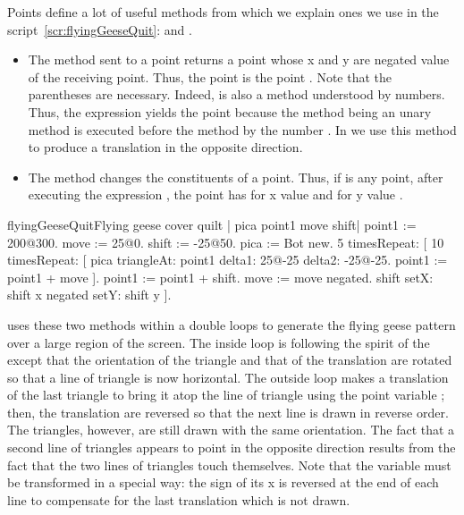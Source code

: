 Points define a lot of useful methods from which we explain ones  we use in the script~\ref{scr:flyingGeeseQuit}:  and .
\begin{itemize}
\item 
The method  sent to a point returns a point whose
x and y are negated value of the receiving
point. Thus, the point  is the point . Note that the
parentheses are necessary. Indeed,  is also a
method understood by numbers. Thus, the expression
 yields the point 
because the method  being an unary method 
is executed before the method  by the
number . In  we use this
method to produce a translation in the opposite direction.

\item The method  changes the constituents of a point.
Thus, if \ct{point} is any point, after executing the expression
\ct{point\ setX: 200\ setY: 400}, the point has for x value  and for y value . 
\end{itemize}

\begin{scriptfig}{flyingGeeseQuit}{Flying geese cover quilt}
\label{scr:flyingGeeseQuit}
| pica point1 move shift|
point1 := 200@300.
move := 25@0.
shift := -25@50.
pica := Bot new.
5 timesRepeat: 
     [ 10 timesRepeat: 
          [ pica 
               triangleAt: point1 
               delta1: 25@-25 
               delta2: -25@-25.
           point1 := point1 + move ].
     point1 := point1 + shift.
     move := move negated.
     shift setX: shift x negated setY: shift y ].
\end{scriptfig}

 uses these two methods within a double loops to generate the flying geese pattern over a large region of the screen. The inside loop is following the spirit of the  except that the orientation of the triangle and that of the translation are rotated so that a line of triangle is now horizontal. The outside loop makes a translation of the last triangle to bring it atop the line of triangle using the point variable ; then, the translation are reversed so that the next line is drawn in reverse order. The triangles, however, are still drawn with the same orientation. The fact that
a second line of triangles appears to point in the opposite
direction results from the fact that the two lines of triangles
touch themselves. Note that the variable  must be
transformed in a special way: the sign of its x is reversed
at the end of each line to compensate for the last translation
which is not drawn.


